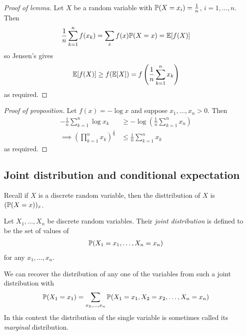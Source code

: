 \documentclass{../template/note}
\begin{document}
    \begin{proof}[Proof of lemma]
        Let \(X\) be a random variable with \(\mathbb P(X = x_i) = \frac 1 n\), \(i=1, \dots, n\). Then
        \begin{align*}
            \frac 1 n \sum_{k=1}^n f(x_k) = \sum_x f(x) \mathbb P(X = x) = \mathbb E[f(X)]
        \end{align*}
        so Jensen's gives
        \begin{align*}
            \mathbb E[f(X)] \geq f(\mathbb E[X]) = f\left(\frac 1 n \sum_{k=1}^n x_k\right)
        \end{align*}
        as required.        
    \end{proof}
    
    \begin{proof}[Proof of proposition]
        Let \(f(x) = -\log x\) and suppose \(x_1, \dots, x_n > 0\). Then
        \begin{align*}
            -\frac 1 n \sum_{k=1}^n \log x_k &\geq -\log \left(\frac 1 n \sum_{k=1}^n x_n\right) \\
            \implies \left(\prod_{k=1}^n x_k\right)^{\frac 1 n} &\leq \frac 1 n \sum_{k=1}^n x_k
        \end{align*}
        as required.        
    \end{proof}
    
    \subsection{Joint distribution and conditional expectation}

    Recall if \(X\) is a discrete random variable, then the disttribution of \(X\) is \((\mathbb P(X = x))_x\).

    \begin{definition}
        Let \(X_1, \dots, X_n\) be discrete random variables. Their \emph{joint distribution} is defined to be the set of values of
        \begin{align*}
            \mathbb P(X_1 = x_1, \dots, X_n = x_n)
        \end{align*}
        for any \(x_1, \dots, x_n\).        
    \end{definition}
    
    \begin{remark*}
        We can recover the distribution of any one of the variables from such a joint distribution with
        \begin{align*}
            \mathbb P(X_1 = x_1) = \sum_{x_2, \dots, x_n} \mathbb P(X_1 = x_1, X_2 = x_2, \dots, X_n = x_n)
        \end{align*}
        In this context the distribution of the single variable is sometimes called its \emph{marginal} distribution.        
    \end{remark*}
    
\end{document}
